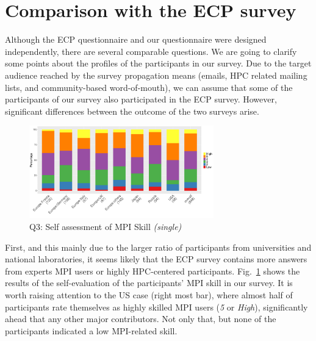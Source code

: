 \documentclass[preprint,5p,times]{elsarticle}
\def\myquote#1{{\it #1}}
\newcommand{\revision}[2]{{\color{blue}#2}}
\def\mcountries{major contributors\xspace{}}%
\begin{document}
\section{Comparison with the ECP survey}\label{sec:ecp}

Although the ECP questionnaire and our questionnaire were designed
independently, there are several comparable
questions. \revision{Before going into the details, we need}{We are
  going} to clarify some points about the profiles of the participants 
in our survey.
%
Due to the target audience reached by the survey propagation means (emails, HPC
related mailing lists, and \revision{community based word-of-the-mouth}{community-based word-of-mouth)}, we can assume
that some of the participants of our survey also participated in the ECP survey.
However, significant differences between the outcome of the two surveys arise.

\begin{figure}[tb]
  \begin{center}
    \includegraphics[width=8.0cm]{R-scripts/Q3.pdf}
    \caption{Q3: Self assessment of MPI Skill {\it(single)}}
    \label{fig:mpi-skill}
\vspace{-3mm}%
  \end{center}
\end{figure}

First, and this mainly due to the larger ratio of participants from universities
and national laboratories, it seems likely that the ECP survey contains more
answers from \revision{highly HPC-centered participants or experts MPI
  users}{experts MPI users or highly HPC-centered participants}. 
Fig.~\ref{fig:mpi-skill} shows the results of \revision{}{the} self-evaluation of the
\revision{participants}{participants'} MPI skill in our survey.  It is worth raising attention to the US
case (right most bar), where almost half of participants rate themselves as
highly skilled MPI users (\myquote{5} or \myquote{High}), significantly ahead
that any other \mcountries. Not only that, but none of the participants
indicated a low MPI-related skill.
\end{document}
